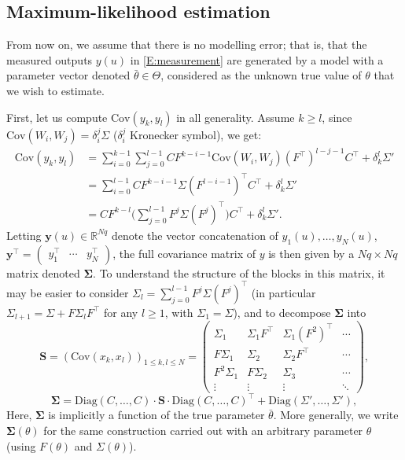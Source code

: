 \documentclass[a4paper]{article}
\theoremstyle{definition}
\theoremstyle{remark}
\newcommand{\R}{\mathbb{R}}
\newcommand{\Cov}{\mathrm{Cov}}
\newcommand{\yb}{\mathbf{y}}
\newcommand{\Sb}{\mathbf{S}}
\newcommand{\Sigmab}{\boldsymbol{\Sigma}}
\begin{document}
\subsection{Maximum-likelihood estimation}

From now on, we assume that there is no modelling error; that is, that the measured outputs $y(u)$ in \eqref{E:measurement} are generated by a model with a parameter vector denoted $\bar\theta\in \Theta$, considered as the unknown true value of $\theta$ that we wish to estimate.

First, let us compute $\Cov(y_k,y_l)$ in all generality. Assume $k\geq l$, since $\Cov(W_i,W_j)=\delta_i^j \Sigma$ ($\delta_i^j$ Kronecker symbol), we get:
$$
\begin{aligned}
\Cov(y_k,y_l)
&=
\sum_{i=0}^{k-1}\sum_{j=0}^{l-1}CF^{k-i-1}\Cov(W_i,W_j)(F^\top)^{l-j-1}C^\top
+\delta_k^l\Sigma'\\
&=
\sum_{i=0}^{l-1}CF^{k-i-1}\Sigma(F^{l-i-1})^\top C^\top
+\delta_k^l\Sigma'
\\
&=
CF^{k-l}\bigg(\sum_{j=0}^{l-1}F^{j}\Sigma(F^j)^{\top}\bigg)C^\top
+\delta_k^l\Sigma'. %
\end{aligned}
$$
Letting $\yb(u)\in \R^{Nq}$ denote the vector concatenation of $y_1(u),\dots ,y_N(u)$, $\yb^\top=\begin{pmatrix}
y_1^\top & \cdots & y_N^\top
\end{pmatrix}$,
the full covariance matrix of $y$ is then given by a $Nq\times Nq$ matrix denoted $\Sigmab$. To understand the structure of the blocks in this matrix, it may be easier to consider $\Sigma_l=\sum_{j=0}^{l-1}F^{j}\Sigma(F^j)^{\top}$ (in particular $\Sigma_{l+1}=\Sigma+F \Sigma_l F^\top$ for any $l\geq 1$, with $\Sigma_1=\Sigma$), and to decompose $\Sigmab$ into
$$
\Sb
=
\left(\Cov(x_k,  x_l)\right)_{1\leq k,l\leq N}
=
\begin{pmatrix}
\Sigma_1 & \Sigma_1 F^\top & \Sigma_1 (F^2)^\top & \cdots 
\\
F \Sigma_1 & \Sigma_2  & \Sigma_2 F^\top & \cdots 
\\
F^2 \Sigma_1 & F\Sigma_2  & \Sigma_3  & \cdots 
\\
\vdots&\vdots&\vdots&\ddots
\end{pmatrix},
$$
$$
\Sigmab
=
\mathrm{Diag}(C,\dots, C)
\cdot\Sb\cdot
\mathrm{Diag}(C,\dots, C)^\top
+
\mathrm{Diag}(\Sigma', \dots, \Sigma'),
$$
Here, $\Sigmab$ is implicitly a function of the true parameter $\bar\theta$. %
More generally, we write $\Sigmab(\theta)$ for the same construction carried out with an arbitrary parameter $\theta$ (using $F(\theta)$ and $\Sigma(\theta)$).
\end{document}
